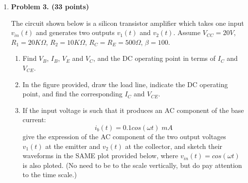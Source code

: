 \begin{enumerate}
{\bf Solution:} 

\begin{itemize}
\item $\beta \uparrow \Longrightarrow I_C \uparrow \Longrightarrow V_C \downarrow 
  \Longrightarrow I_B \downarrow \Longrightarrow I_C \downarrow $
\item
\[ I_B=\frac{V_{CC}-0.7}{(\beta+1)R_C+R_B},\;\;\;\;\;
   I_C=\beta I_B=\frac{\beta(V_{CC}-0.7)}{(\beta+1)R_C+R_B}  \]
\item If $(\beta+1)R_C \gg R_B$, then $I_C \approx (V_{CC}-0.7)/R_C$, 
independent of $\beta$.
\item $I_C=2mA$, $V_C=5V$, $R_C=(V_{CC}-V_C)/I_C=5V/2mA=2.5K\Omega$,
$I_B=I_C/\beta=0.02mA$, $R_B=(5-0.7)/0.02=4.3/0.02=215K\Omega$.
\item 
When $\beta=50$:
\[	I_B=\frac{V_{CC}-0.7}{(\beta+1)R_C+R_B}=\frac{9.3}{51\times 2.5K+215}
	=0.027mA \]
\[ 	I_C=\beta I_B=1.36mA,\;\;\;V_C=V_{CC}-(\beta+1)I_B=6.6V \]
When $\beta=100$:
\[	I_B=\frac{V_{CC}-0.7}{(\beta+1)R_C+R_B}=\frac{9.3}{101\times 2.5K+215}
	=0.02mA \]
\[ 	I_C=\beta I_B=2 mA,\;\;\;V_C=V_{CC}-(\beta+1)I_B=5V \]
When $\beta=200$:
\[	I_B=\frac{V_{CC}-0.7}{(\beta+1)R_C+R_B}=\frac{9.3}{201\times 2.5K+215}
	=0.013mA \]
\[ 	I_C=\beta I_B=2.6mA,\;\;\;V_C=V_{CC}-(\beta+1)I_B=3.5V \]
\end{itemize}

\item {\bf Problem 3. (33 points)} 


The circuit shown below is a silicon transistor amplifier which takes one
input $v_{in}(t)$ and generates two outputs $v_1(t)$ and $v_2(t)$. Assume 
$V_{CC}=20V$, $R_1=20K\Omega$, $R_2=10K\Omega$, $R_C=R_E=500\Omega$, $\beta=100$. 

\begin{enumerate}
\item Find $V_B$, $I_B$, $V_E$ and $V_C$, and the DC operating point in 
terms of $I_C$ and $V_{CE}$. 
\item In the figure provided, draw the load line, indicate the DC operating 
point, and find the corresponding $I_C$ and $V_{CE}$.
\item If the input voltage is such that it produces an AC component of the 
base current:
\[	i_b(t)=0.1 cos(\omega t) \; mA	\]
give the expression of the AC component of the two output voltages $v_1(t)$ 
at the emitter and $v_2(t)$ at the collector, and sketch their waveforms in 
the SAME plot provided below, where $v_{in}(t)=cos(\omega t)$ is also ploted.
(No need to be to the scale vertically, but do pay attention to the time
scale.)
\end{enumerate}


\end{enumerate}

